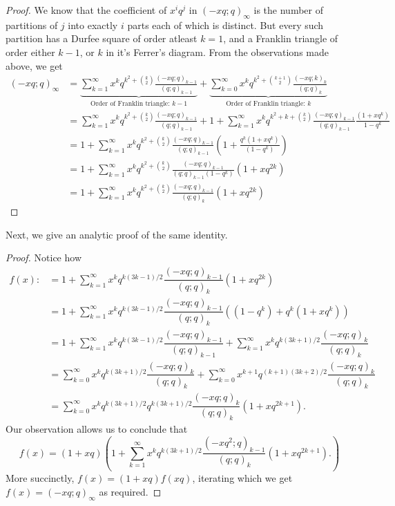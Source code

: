 \begin{proof}
    We know that the coefficient of $x^iq^j$ in $\left( -xq;q \right)_{\infty}$ is the number of partitions of $j$ into exactly $i$ parts each of which is distinct. But every such partition has a Durfee square of order atleast $k=1$, and a Franklin triangle of order either $k-1$, or $k$ in it's Ferrer's diagram. From the observations made above, we get
 \begin{align*}
	 \left( -xq;q \right)_{\infty} &= \underbrace{\sum_{k=1}^{\infty} x^kq^{k^2+\binom{k}{2}}\frac{\left( -xq;q \right)_{k-1}}{\left( q;q \right)_{k-1}}}_{\text{Order of Franklin triangle: } k-1} + \underbrace{\sum_{k=0}^{\infty} x^kq^{k^2+\binom{k+1}{2}} \frac{\left( -xq;k \right)_{k}}{\left( q;q \right)_{k}}}_{\text{Order of Franklin triangle: } k} \\
				       &= \sum_{k=1}^{\infty} x^k q^{k^2+\binom{k}{2}} \frac{\left( -xq;q \right)_{k-1}}{\left( q;q \right)_{k-1}} + 1 + \sum_{k=1}^{\infty}x^kq^{k^2+k+\binom{k}{2}}\frac{\left( -xq;q \right)_{k-1}}{\left( q;q \right)_{k-1}}\frac{\left( 1+xq^k \right)}{1-q^k} \\
				       &= 1+\sum_{k=1}^{\infty} x^kq^{k^2+\binom{k}{2}}\frac{\left( -xq;q \right)_{k-1}}{\left( q;q \right)_{k-1}}\left( 1+\frac{q^k\left( 1+xq^k \right)}{\left( 1-q^k \right) } \right)  \\
				       &= 1+\sum_{k=1}^{\infty} x^kq^{k^2+\binom{k}{2}}\frac{\left( -xq;q \right)_{k-1}}{\left( q;q \right)_{k-1}\left( 1-q^k \right)}\left( 1+xq^{2k} \right) \\
				       &= 1+\sum_{k=1}^{\infty} x^kq^{k^2+\binom{k}{2}}\frac{\left( -xq;q \right)_{k-1}}{\left( q;q \right)_{k}}\left( 1+xq^{2k} \right)
\end{align*}
\end{proof}
Next, we give an analytic proof of the same identity. 
\begin{proof}
Notice how 
\begin{align*}
    f(x):&= 1+\sum_{k=1}^{\infty}x^kq^{k(3k-1)/2}\dfrac{(-xq;q)_{k-1}}{(q;q)_k}(1+xq^{2k}) \\
    &= 1+\sum_{k=1}^{\infty}x^kq^{k(3k-1)/2}\dfrac{(-xq;q)_{k-1}}{(q;q)_k}\left((1-q^k)+q^k(1+xq^k)\right) \\
    &= 1+\sum_{k=1}^{\infty}x^kq^{k(3k-1)/2}\dfrac{(-xq;q)_{k-1}}{(q;q)_{k-1}}+\sum_{k=1}^{\infty}x^kq^{k(3k+1)/2}\dfrac{(-xq;q)_k}{(q;q)_k} \\
    &= \sum_{k=0}^{\infty}x^kq^{k(3k+1)/2}\dfrac{(-xq;q)_k}{(q;q)_k}+\sum_{k=0}^{\infty}x^{k+1}q^{(k+1)(3k+2)/2}\dfrac{(-xq;q)_k}{(q;q)_k} \\
    &= \sum_{k=0}^{\infty}x^k q^{k(3k+1)/2}q^{k(3k+1)/2}\dfrac{(-xq;q)_k}{(q;q)_k}(1+xq^{2k+1}).
\end{align*}
Our observation allows us to conclude that
\[
f(x) = (1+xq)\left(
1+\sum_{k=1}^{\infty}x^kq^{k(3k+1)/2}\dfrac{(-xq^2;q)_{k-1}}{(q;q)_k}(1+xq^{2k+1}).
\right)
\]
More succinctly, $f(x)=(1+xq)f(xq)$, iterating which we get $f(x)=(-xq;q)_\infty$ as required. 
\end{proof}
